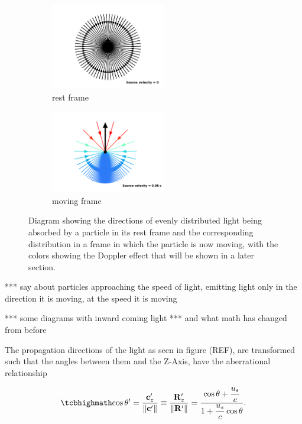 \begin{figure}[ht]
	\begin{subfigure}{.49\textwidth}
		\centering
		\includegraphics[width=5cm]{images/pdf/Aberrated_velocities_inwards_restframe.pdf}
		\caption{rest frame}
	\end{subfigure}
	\begin{subfigure}{.49\textwidth}
		\centering
		\includegraphics[width=5cm]{images/pdf/Aberrated_velocities_inwards.pdf}
		\caption{moving frame}
	\end{subfigure}
	\caption{Diagram showing the directions of evenly distributed light being absorbed by a particle in its rest frame and the corresponding distribution in a frame in which the particle is now moving, with the colors showing the Doppler effect that will be shown in a later section.}
\end{figure}

*** say about particles approaching the speed of light, emitting light only in the direction it is moving, at the speed it is moving

*** some diagrams with inward coming light ***
and what math has changed from before

The propagation directions of the light as seen in figure (REF), are transformed such that the angles between them and the Z-Axis, have the aberrational relationship

\begin{equation}
	\label{Cosine transform}
	\mhl{
	\cos\theta' = \frac{\mathbf{c}'_z}{\|\mathbf{c}'\|} \equiv \frac{\mathbf{R}'_{z}}{\|\mathbf{R}'\|} =  \dfrac{\cos\theta + \dfrac{u_s}{c}}{1+\dfrac{u_s}{c}\cos\theta}.
	}
\end{equation}

